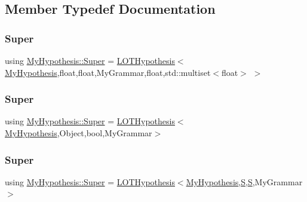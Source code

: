 \subsection{Member Typedef Documentation}
\mbox{\label{class_my_hypothesis_aebf7eaf0477f8b39639e917bc87d208f}} 
\subsubsection{\texorpdfstring{Super}{Super}\hspace{0.1cm}{\footnotesize\ttfamily [1/6]}}
{\footnotesize\ttfamily using \hyperlink{class_my_hypothesis_a12e3d952f8fca502912d3bd868fa9f99}{My\+Hypothesis\+::\+Super} =  \hyperlink{class_l_o_t_hypothesis}{L\+O\+T\+Hypothesis}$<$\hyperlink{class_my_hypothesis}{My\+Hypothesis},float,float,My\+Grammar,float,std\+::multiset$<$float$>$ $>$}

\mbox{\label{class_my_hypothesis_af34a1c11e5b0aae4a52b54bfdd7a0617}} 
\subsubsection{\texorpdfstring{Super}{Super}\hspace{0.1cm}{\footnotesize\ttfamily [2/6]}}
{\footnotesize\ttfamily using \hyperlink{class_my_hypothesis_a12e3d952f8fca502912d3bd868fa9f99}{My\+Hypothesis\+::\+Super} =  \hyperlink{class_l_o_t_hypothesis}{L\+O\+T\+Hypothesis}$<$\hyperlink{class_my_hypothesis}{My\+Hypothesis},Object,bool,My\+Grammar$>$}

\mbox{\label{class_my_hypothesis_ae5fab2ea7ef7729968ac60a2ce267168}} 
\subsubsection{\texorpdfstring{Super}{Super}\hspace{0.1cm}{\footnotesize\ttfamily [3/6]}}
{\footnotesize\ttfamily using \hyperlink{class_my_hypothesis_a12e3d952f8fca502912d3bd868fa9f99}{My\+Hypothesis\+::\+Super} =  \hyperlink{class_l_o_t_hypothesis}{L\+O\+T\+Hypothesis}$<$\hyperlink{class_my_hypothesis}{My\+Hypothesis},\hyperlink{_models_2_formal_language_theory-_complex_2_main_8cpp_a51c40915539205f0b5add30b0d68a4cb}{S},\hyperlink{_models_2_formal_language_theory-_complex_2_main_8cpp_a51c40915539205f0b5add30b0d68a4cb}{S},My\+Grammar$>$}

